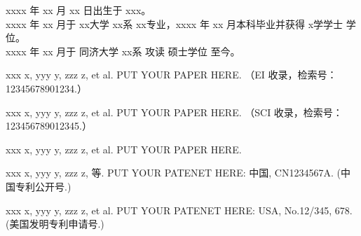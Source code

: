 \noindent xxxx 年 xx 月 xx 日出生于 xxx。\\
\noindent xxxx 年 xx 月于 xx大学 xx系 xx专业，xxxx 年 xx 月本科毕业并获得 x学学士 学位。 \\
\noindent xxxx 年 xx 月于 同济大学 xx系 攻读 硕士学位 至今。

\begin{enumerate}[{[}1{]}]
\item xxx x, yyy y, zzz z, et al. PUT YOUR PAPER HERE. （EI 收录，检索号：12345678901234.）
\item xxx x, yyy y, zzz z, et al. PUT YOUR PAPER HERE. （SCI 收录，检索号：123456789012345.）
\end{enumerate}

\begin{enumerate}[{[}1{]}]
\item xxx x, yyy y, zzz z, et al. PUT YOUR PAPER HERE.

\begin{enumerate}[{[}1{]}]
\item xxx x, yyy y, zzz z, 等. PUT YOUR PATENET HERE: 中国, CN1234567A. (中国专利公开号.)
\item xxx x, yyy y, zzz z, et al. PUT YOUR PATENET HERE: USA, No.12/345, 678. (美国发明专利申请号.)
\end{enumerate}

\end{enumerate}


